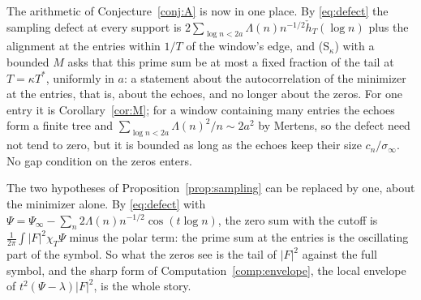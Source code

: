 \documentclass[11pt]{article}
\theoremstyle{definition}
\theoremstyle{remark}
\newcommand{\Tst}{T^{*}}
\begin{document}
The arithmetic of Conjecture~\ref{conj:A} is now in one place. By \eqref{eq:defect} the sampling defect at every support is $2\sum_{\log n<2a}\Lambda(n)n^{-1/2}\check h_T(\log n)$ plus the alignment at the entries within $1/T$ of the window's edge, and (S$_\kappa$) with a bounded $M$ asks that this prime sum be at most a fixed fraction of the tail at $T=\kappa\Tst$, uniformly in $a$: a statement about the autocorrelation of the minimizer at the entries, that is, about the echoes, and no longer about the zeros. For one entry it is Corollary~\ref{cor:M}; for a window containing many entries the echoes form a finite tree and $\sum_{\log n<2a}\Lambda(n)^2/n\sim2a^2$ by Mertens, so the defect need not tend to zero, but it is bounded as long as the echoes keep their size $c_n/\sigma_\infty$. No gap condition on the zeros enters.

The two hypotheses of Proposition~\ref{prop:sampling} can be replaced by one, about the minimizer alone. By \eqref{eq:defect} with $\Psi=\Psi_\infty-\sum_n2\Lambda(n)n^{-1/2}\cos(t\log n)$, the zero sum with the cutoff is $\frac1{2\pi}\int|F|^2\chi_T\Psi$ minus the polar term: the prime sum at the entries is the oscillating part of the symbol. So what the zeros see is the tail of $|F|^2$ against the full symbol, and the sharp form of Computation~\ref{comp:envelope}, the local envelope of $t^2(\Psi-\lambda)|F|^2$, is the whole story.
\end{document}
